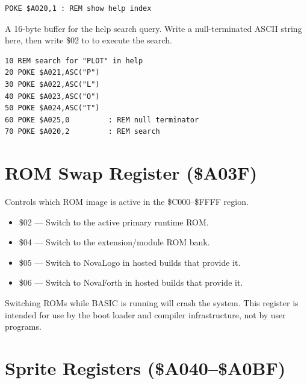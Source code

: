 \begin{lstlisting}
POKE $A020,1 : REM show help index
\end{lstlisting}


A 16-byte buffer for the help search query.  Write a null-terminated ASCII
string here, then write \$02 to  to execute the search.

\begin{lstlisting}
10 REM search for "PLOT" in help
20 POKE $A021,ASC("P")
30 POKE $A022,ASC("L")
40 POKE $A023,ASC("O")
50 POKE $A024,ASC("T")
60 POKE $A025,0         : REM null terminator
70 POKE $A020,2         : REM search
\end{lstlisting}


\section{ROM Swap Register (\$A03F)}
\label{sec:vgc-romswap}


Controls which ROM image is active in the \$C000--\$FFFF region.

\begin{itemize}
  \item \$02 --- Switch to the active primary runtime ROM.
  \item \$04 --- Switch to the extension/module ROM bank.
  \item \$05 --- Switch to NovaLogo in hosted builds that provide it.
  \item \$06 --- Switch to NovaForth in hosted builds that provide it.
\end{itemize}

\begin{warningbox}
Switching ROMs while BASIC is running will crash the system.  This register is
intended for use by the boot loader and compiler infrastructure, not by user
programs.
\end{warningbox}


\section{Sprite Registers (\$A040--\$A0BF)}
\label{sec:vgc-sprite-regs}

